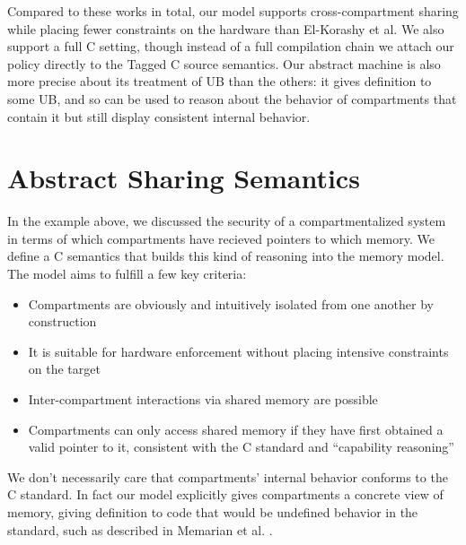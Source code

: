 \documentclass{article}
\begin{document}
Compared to these works in total, our model supports cross-compartment sharing while placing
fewer constraints on the hardware than El-Korashy et al. We also support a full C setting,
though instead of a full compilation chain we attach our policy directly to the Tagged C
source semantics. Our abstract machine is also more precise about its treatment of UB than
the others: it gives definition to some UB, and so can be used to reason about the behavior
of compartments that contain it but still display consistent internal behavior.

\section{Abstract Sharing Semantics}

In the example above, we discussed the security of a compartmentalized
system in terms of which compartments have recieved pointers to which memory.
We define a C semantics that builds this kind of reasoning into the memory model.
The model aims to fulfill a few key criteria:

\begin{itemize}
\item Compartments are obviously and intuitively isolated from one another
  by construction
\item It is suitable for hardware enforcement without placing intensive constraints
  on the target
\item Inter-compartment interactions via shared memory are possible
\item Compartments can only access shared memory if they have first obtained a
  valid pointer to it, consistent with the C standard and ``capability reasoning''
\end{itemize}

We don't necessarily care that compartments' internal behavior
conforms to the C standard. In fact our model explicitly gives compartments
a concrete view of memory, giving definition to code that would be undefined behavior
in the standard, such as described in Memarian et al. \cite{Memarian19:ExploringCSemantics}.
\end{document}

